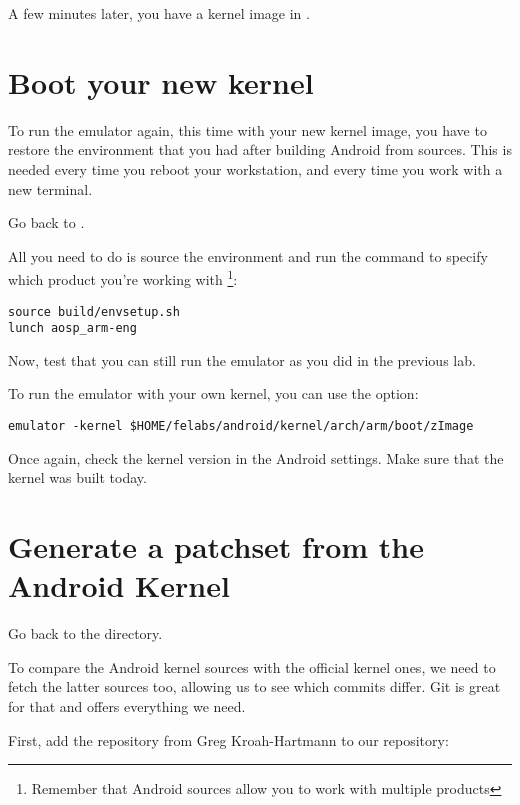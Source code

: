 
A few minutes later, you have a kernel image in .

\section{Boot your new kernel}

To run the emulator again, this time with your new kernel image, you
have to restore the environment that you had after building Android
from sources. This is needed every time you reboot your workstation,
and every time you work with a new terminal.

Go back to .

All you need to do is source the environment and run the 
command to specify which product you're working with
\footnote{Remember that Android sources allow you to work with
  multiple products}:

\begin{verbatim}
source build/envsetup.sh
lunch aosp_arm-eng
\end{verbatim}

Now, test that you can still run the emulator as you did in the
previous lab.

To run the emulator with your own kernel, you can use the
 option:

\begin{verbatim}
emulator -kernel $HOME/felabs/android/kernel/arch/arm/boot/zImage
\end{verbatim}

Once again, check the kernel version in the Android settings. Make
sure that the kernel was built today.

\section{Generate a patchset from the Android Kernel}

Go back to the  directory.

To compare the Android kernel sources with the official kernel ones,
we need to fetch the latter sources too, allowing us to see which
commits differ. Git is great for that and offers everything we need.

First, add the  repository from Greg Kroah-Hartmann
to our repository:


